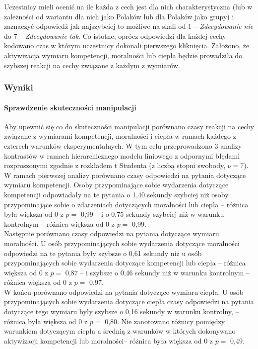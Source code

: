 \documentclass[man]{apa6}
\begin{document}
Uczestnicy mieli ocenić na ile każda z cech jest dla nich charakterystyczna (lub w zależności od wariantu dla nich jako Polaków lub dla Polaków jako grupy) i zaznaczyć odpowiedź jak najszybciej to możliwe na skali od 1 -- \emph{Zdecydowanie nie} do 7 -- \emph{Zdecydowanie tak}. Co istotne, oprócz odpowiedzi dla każdej cechy kodowano czas w którym uczestnicy dokonali pierwszego kliknięcia. Założono, że aktywizacja wymiaru kompetencji, moralności lub ciepła będzie prowadziła do szybszej reakcji na cechy związane z każdym z wymiarów.

\subsubsection{Wyniki}
\paragraph{Sprawdzenie skuteczności manipulacji}
Aby upewnić się co do skuteczności manipulacji porównano czasy reakcji na cechy związane z wymiarami kompetencji, moralności i ciepła w ramach każdego z czterech warunków eksperymentalnych. W tym celu przeprowadzono 3 analizy kontrastów w ramach hierarchicznego modelu liniowego \parencite[odpowiednika  klasycznej jednoczynnikowej analizy wariancji, za:,][]{kruschke2014doing} z odpornymi błędami rozproszonymi zgodnie z rozkładem t Studenta (z liczbą stopni swobody, $\nu = 7$).\\

W ramach pierwszej analizy porównano czasy odpowiedzi na pytania dotyczące wymiaru kompetencji. Osoby przypominające sobie wydarzenia dotyczące kompetencji odpowiadały na te pytania o 1,40 sekundy szybciej niż osoby przypominające sobie o zdarzeniach dotyczących moralności lub ciepła -- różnica była większa od 0 z $p =$ 0,99 -- i o 0,75 sekundy szybciej niż w warunku kontrolnym -- różnica większa od 0 z $p =$ 0,99.\\

Następnie porównano czasy odpowiedzi na pytania dotyczące wymiaru moralności. U osób przypominających sobie wydarzenia dotyczące moralności odpowiedzi na te pytania były szybsze o 0,61 sekundy niż u osób przypominających sobie wydarzenia dotyczące kompetencji lub ciepła -- różnica większa od 0 z $p =$ 0,87 -- i szybsze o 0,46 sekundy niż w warunku kontrolnym -- różnica większa od 0 z $p =$ 0,97. \\

W końcu porównano odpowiedzi na pytania dotyczące wymiaru ciepła. U osób przypominających sobie wydarzenia dotyczące ciepła czasy odpowiedzi na pytania dotyczące tego wymiaru były szybsze o 0,16 sekundy w warunku kontrolny, -- różnica była większa od 0 z $p =$ 0,80. Nie zanotowano różnicy pomiędzy warunkiem dotyczącym ciepła a średnią z warunków w których dokonywano aktywizacji kompetencji lub moralności-- różnica była większa od 0 z $p =$ 0,49.\\
\end{document}
